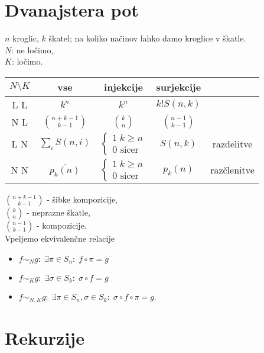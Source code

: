 \documentclass[a4paper, 12pt]{book}
\theoremstyle{definition}
\theoremstyle{remark}
\begin{document}
\section{Dvanajstera pot}

$n$ kroglic, $k$ škatel; na koliko načinov lahko damo kroglice v škatle. \\
$N$: ne ločimo, \\
$K$: ločimo.
\begin{center}
  \begin{tabular}{c | c | c | c | c}
    $N \setminus K$ & vse & injekcije & surjekcije & \\
    \hline
    L L & $k^n$ & $k^{\underline{n}}$ & $k! S(n,k)$ & \\
    N L & $\binom{n+k-1}{k-1}$ & $\binom{k}{n}$ & $\binom{n-1}{k-1}$ & \\
    L N & $\sum_i S(n,i)$ & $\begin{cases}1 \; k \geq n \\ 0 \text{ sicer} \end{cases}$ & $S(n,k)$ & razdelitve \\
    N N & $\overline{p_k(n)}$ & $\begin{cases}1 \; k \geq n \\ 0 \text{ sicer} \end{cases}$ & $p_k(n)$ & razčlenitve
  \end{tabular}
\end{center}
$\binom{n+k-1}{k-1}$ - šibke kompozicije, \\
$\binom{k}{n}$ - neprazne škatle, \\
$\binom{n-1}{k-1}$ - kompozicije. \\
Vpeljemo ekvivalenčne relacije
\begin{itemize}
  \item $f \sim_N g: \; \exists \pi \in S_n: \; f \circ \pi = g$
  \item $f \sim_K g: \; \exists \sigma \in S_k: \; \sigma \circ f = g$
  \item $f \sim_{N,K} g: \; \exists \pi \in S_n, \sigma \in S_k: \; \sigma \circ f \circ \pi = g$.
\end{itemize}


\section{Rekurzije}
\end{document}
